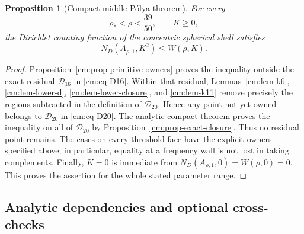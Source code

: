 \documentclass[11pt]{article}
\numberwithin{equation}{section}
\newtheorem{proposition}[theorem]{Proposition}
\theoremstyle{definition}
\theoremstyle{remark}
\begin{document}
\begin{proposition}[Compact-middle P\'olya theorem]
\label{prop:compact-middle}
For every
\[
 \rho_*<\rho<\frac{39}{50},\qquad K\geq0,
\]
the Dirichlet counting function of the concentric spherical shell satisfies
\[
 N_D(A_{\rho,1},K^2)\leq W(\rho,K).
\]
\end{proposition}

\begin{proof}
Proposition~\ref{cm:prop-primitive-owners} proves the inequality outside
the exact residual \(\mathcal D_{16}\) in \eqref{cm:eq-D16}.  Within that
residual, Lemmas~\ref{cm:lem-k6}, \ref{cm:lem-lower-d},
\ref{cm:lem-lower-closure}, and \ref{cm:lem-k11} remove precisely the regions
subtracted in the definition of \(\mathcal D_{20}\).  Hence any point not
yet owned belongs to
\(\mathcal D_{20}\) in \eqref{cm:eq-D20}.  The analytic compact theorem proves
the inequality on all of \(\mathcal D_{20}\) by
Proposition~\ref{cm:prop-exact-closure}.  Thus no residual point remains.
The cases on every threshold face have
the explicit owners specified above; in particular, equality at a
frequency wall is not lost in taking complements.  Finally, \(K=0\) is
immediate from \(N_D(A_{\rho,1},0)=W(\rho,0)=0\).  This proves the assertion for
the whole stated parameter range.
\end{proof}

\subsection{Analytic dependencies and optional cross-checks}
\label{cm:sec-certificate-protocol}
\end{document}
